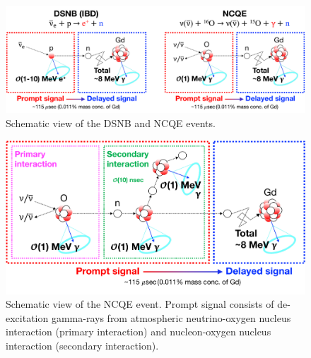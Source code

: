 \begin{figure}[tbp]
	\centering
	\includegraphics[width=16cm]{Figures/Introduction/IBD_NCQE}
	\caption[Schematic view of the DSNB and NCQE events]{\label{Introd_IBD_NCQE} Schematic view of the DSNB and NCQE events.}
\end{figure}

\begin{figure}[tbp]
	\centering
	\includegraphics[width=12cm]{Figures/Introduction/NCQE_PriSec}
	\caption[Schematic view of the NCQE event]{\label{Introd_IBD_NCQE} Schematic view of the NCQE event. Prompt signal consists of de-excitation gamma-rays from atmospheric neutrino-oxygen nucleus interaction (primary interaction) and nucleon-oxygen nucleus interaction (secondary interaction).}
\end{figure}

\newpage
